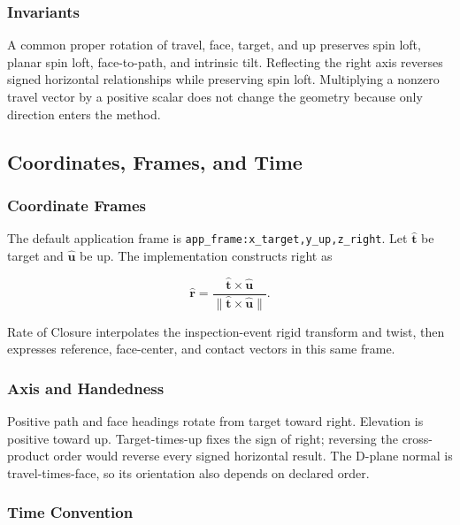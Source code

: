 \documentclass[
  american,
]{article}
\begin{document}
\subsubsection{Invariants}\label{invariants}

A common proper rotation of travel, face, target, and up preserves spin
loft, planar spin loft, face-to-path, and intrinsic tilt. Reflecting the
right axis reverses signed horizontal relationships while preserving
spin loft. Multiplying a nonzero travel vector by a positive scalar does
not change the geometry because only direction enters the method.

\subsection{Coordinates, Frames, and
Time}\label{coordinates-frames-and-time}

\subsubsection{Coordinate Frames}\label{coordinate-frames}

\protect{}\label{dplane-coordinate-frame}{}

The default application frame is
\texttt{app\_frame:x\_target,y\_up,z\_right}. Let \(\hat{\mathbf t}\) be
target and \(\hat{\mathbf u}\) be up. The implementation constructs
right as

\[
\hat{\mathbf r} =
  \frac{\hat{\mathbf t}\times\hat{\mathbf u}}
       {\lVert\hat{\mathbf t}\times\hat{\mathbf u}\rVert}.
\]

Rate of Closure interpolates the inspection-event rigid transform and
twist, then expresses reference, face-center, and contact vectors in
this same frame.

\subsubsection{Axis and Handedness}\label{axis-and-handedness}

Positive path and face headings rotate from target toward right.
Elevation is positive toward up. Target-times-up fixes the sign of
right; reversing the cross-product order would reverse every signed
horizontal result. The D-plane normal is travel-times-face, so its
orientation also depends on declared order.

\subsubsection{Time Convention}\label{time-convention}
\end{document}
